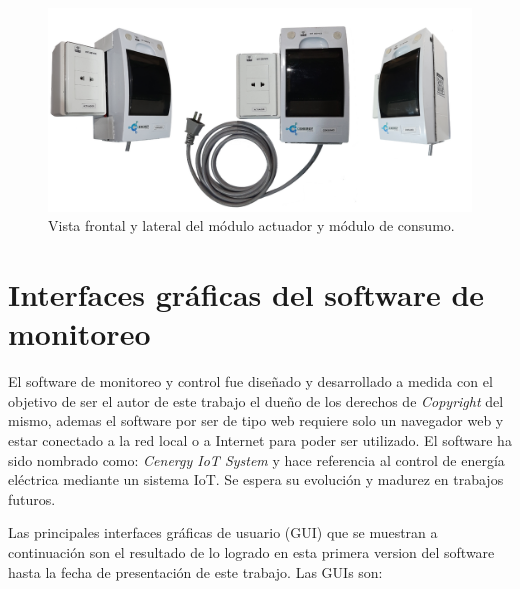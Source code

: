 
\begin{landscape} %
\begin{figure}[htpb]
\centering 
\includegraphics[width=1.8\textwidth]{./Figures/consumo2.png}
\caption{Vista frontal y lateral del módulo actuador y módulo de consumo.}
\label{fig:modConsumo2}
\end{figure}
\end{landscape} %


\section{Interfaces gráficas del software de monitoreo}

El software de monitoreo y control fue diseñado y desarrollado a medida con el objetivo de ser el autor de este trabajo el dueño de los derechos de \emph{Copyright} del mismo, ademas el software por ser de tipo web requiere solo un navegador web y estar conectado a la red local o a Internet para poder ser utilizado. El software ha sido nombrado como: \emph{Cenergy IoT System} y hace referencia al control de energía eléctrica mediante un sistema IoT. Se espera su evolución y madurez en trabajos futuros.

Las principales interfaces gráficas de usuario (GUI) que se muestran a continuación son el resultado de lo logrado en esta primera version del software hasta la fecha de presentación de este trabajo. Las GUIs son:

